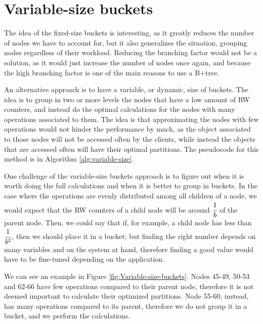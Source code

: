 \section{Variable-size buckets}\label{sec:Variable-size buckets}
The idea of the fixed-size buckets is interesting, as it greatly reduces the number of nodes we have to account for, but it also generalizes the situation, grouping nodes regardless of their workload. Reducing the branching factor would not be a solution, as it would just increase the number of nodes once again, and because the high branching factor is one of the main reasons to use a B+tree. 

An alternative approach is to have a variable, or dynamic, size of buckets. The idea is to group in two or more levels the nodes that have a low amount of RW counters, and instead do the optimal calculations for the nodes with many operations associated to them. The idea is that approximating the nodes with few operations would not hinder the performance by much, as the object associated to those nodes will not be accessed often by the clients, while instead the objects that are accessed often will have their optimal partitions. 
The pseudocode for this method is in Algorithm \ref{alg:variable-size}.


One challenge of the variable-size buckets approach is to figure out when it is worth doing the full calculations and when it is better to group in buckets. In the case where the operations are evenly distributed among all children of a node, we would expect that the RW counters of a child node will be around $\cfrac{1}{b}$ of the parent node. Then, we could say that if, for example, a child node has less than $\cfrac{1}{b^2}$, then we should place it in a bucket; but finding the right number depends on many variables and on the system at hand, therefore finding a good value would have to be fine-tuned depending on the application.

We can see an example in Figure \ref{fig:Variable-size-buckets}. Nodes 45-49, 50-53 and 62-66 have few operations compared to their parent node, therefore it is not deemed important to calculate their optimized partitions. Node 55-60, instead, has many operations compared to its parent, therefore we do not group it in a bucket, and we perform the calculations. 

